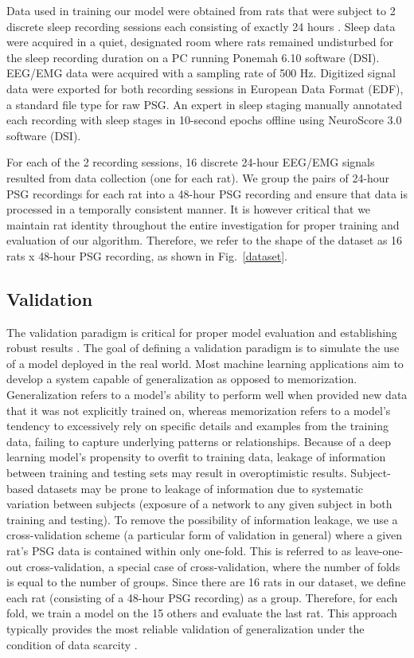 \documentclass[pdflatex,sn-mathphys-num]{sn-jnl}%
\theoremstyle{thmstyleone}%
\theoremstyle{thmstyletwo}%
\theoremstyle{thmstylethree}%
\begin{document}
Data used in training our model were obtained from rats that were subject to 2 discrete sleep recording sessions each consisting of exactly 24 hours \cite{milosavljevic_kynurenine_2023}. Sleep data were acquired in a quiet, designated room where rats remained undisturbed for the sleep recording duration on a PC running Ponemah 6.10 software (DSI). EEG/EMG data were acquired with a sampling rate of 500 Hz. Digitized signal data were exported for both recording sessions in European Data Format (EDF), a standard file type for raw PSG. An expert in sleep staging manually annotated each recording with sleep stages in 10-second epochs offline using NeuroScore 3.0 software (DSI).

For each of the 2 recording sessions, 16 discrete 24-hour EEG/EMG signals resulted from data collection (one for each rat). We group the pairs of 24-hour PSG recordings for each rat into a 48-hour PSG recording and ensure that data is processed in a temporally consistent manner. It is however critical that we maintain rat identity throughout the entire investigation for proper training and evaluation of our algorithm. Therefore, we refer to the shape of the dataset as 16 rats x 48-hour PSG recording, as shown in Fig.~\ref{dataset}.

\subsection*{Validation}
The validation paradigm is critical for proper model evaluation and establishing robust results \cite{Goodfellow-et-al-2016}. The goal of defining a validation paradigm is to simulate the use of a model deployed in the real world. Most machine learning applications aim to develop a system capable of generalization as opposed to memorization. Generalization refers to a model's ability to perform well when provided new data that it was not explicitly trained on, whereas memorization refers to a model's tendency to excessively rely on specific details and examples from the training data, failing to capture underlying patterns or relationships. Because of a deep learning model's propensity to overfit to training data, leakage of information between training and testing sets may result in overoptimistic results. Subject-based datasets may be prone to leakage of information due to systematic variation between subjects (exposure of a network to any given subject in both training and testing). To remove the possibility of information leakage, we use a cross-validation scheme (a particular form of validation in general) where a given rat's PSG data is contained within only one-fold. This is referred to as leave-one-out cross-validation, a special case of cross-validation, where the number of folds is equal to the number of groups. Since there are 16 rats in our dataset, we define each rat (consisting of a 48-hour PSG recording) as a group. Therefore, for each fold, we train a model on the 15 others and evaluate the last rat. This approach typically provides the most reliable validation of generalization under the condition of data scarcity \cite{Hastie_Tibshirani_Friedman_2009}.
\end{document}
